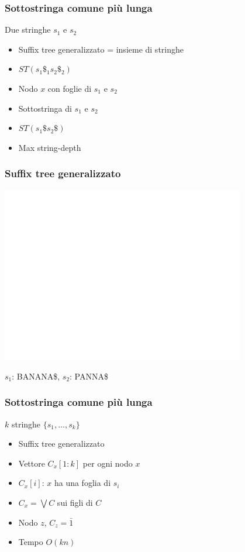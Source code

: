 \begin{frame}[fragile]
\frametitle{Sottostringa comune più lunga}
\begin{block}{Due stringhe $s_{1}$ e $s_{2}$}
\begin{itemize}
\item
Suffix tree generalizzato = insieme di stringhe
\item
$ST(s_{1}\$_{1}s_{2}\$_{2})$
\item
Nodo $x$ con foglie di $s_{1}$ e $s_{2}$
\item
Sottostringa di $s_{1}$ e $s_{2}$
\item
$ST(s_{1}\$s_{2}\$)$
\item
Max string-depth
\end{itemize}
\end{block}
\end{frame}



\begin{frame}
\frametitle{Suffix tree generalizzato}
\begin{center}
\includegraphics[width=0.8\textwidth]{ST-banana-panna}
\end{center}
$s_{1}$: BANANA\$, $s_{2}$: PANNA\$
\end{frame}


\begin{frame}[fragile]
\frametitle{Sottostringa comune più lunga}
\begin{block}{$k$ stringhe $\{s_{1}, \ldots , s_{k}\}$}
\begin{itemize}
\item
Suffix tree generalizzato
\item
Vettore $C_{x}[1:k]$ per ogni nodo $x$
\item
$C_{x}[i]$: $x$ ha una foglia di $s_{i}$
\item
$C_{x} = \bigvee C$ sui figli di $C$
\item
Nodo $z$, $C_{z}=\bar{1}$
\item
Tempo $O(kn)$
\end{itemize}
\end{block}
\end{frame}


